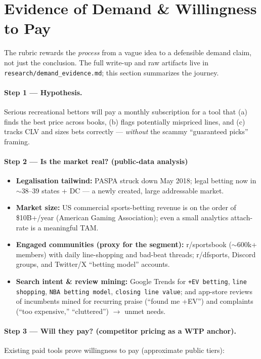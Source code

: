 \documentclass[12pt]{article}
\begin{document}
\section{Evidence of Demand \& Willingness to Pay}

The rubric rewards the \emph{process} from a vague idea to a defensible demand claim, not just
the conclusion. The full write-up and raw artifacts live in
\texttt{research/demand\_evidence.md}; this section summarizes the journey.

\paragraph{Step 1 --- Hypothesis.} Serious recreational bettors will pay a monthly subscription
for a tool that (a) finds the best price across books, (b) flags potentially mispriced lines,
and (c) tracks CLV and sizes bets correctly --- \emph{without} the scammy ``guaranteed picks''
framing.

\paragraph{Step 2 --- Is the market real? (public-data analysis)}
\begin{itemize}[nosep]
  \item \textbf{Legalisation tailwind:} PASPA struck down May 2018; legal betting now in
    $\sim$38--39 states + DC --- a newly created, large addressable market.
  \item \textbf{Market size:} US commercial sports-betting revenue is on the order of
    \$10B+/year (American Gaming Association); even a small analytics attach-rate is a
    meaningful TAM.
  \item \textbf{Engaged communities (proxy for the segment):} r/sportsbook ($\sim$600k+
    members) with daily line-shopping and bad-beat threads; r/dfsports, Discord groups, and
    Twitter/X ``betting model'' accounts.
  \item \textbf{Search intent \& review mining:} Google Trends for \texttt{+EV betting},
    \texttt{line shopping}, \texttt{NBA betting model}, \texttt{closing line value}; and
    app-store reviews of incumbents mined for recurring praise (``found me +EV'') and
    complaints (``too expensive,'' ``cluttered'') $\rightarrow$ unmet needs.
\end{itemize}

\paragraph{Step 3 --- Will they pay? (competitor pricing as a WTP anchor).} Existing paid
tools prove willingness to pay (approximate public tiers):
\end{document}

